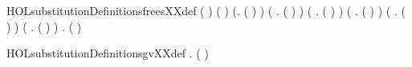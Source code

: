 \newcommand{\HOLsubstitutionDefinitionsfmlaXXsizeXXdef}{\UseVerbatim{HOLsubstitutionDefinitionsfmlaXXsizeXXdef}}
\begin{SaveVerbatim}{HOLsubstitutionDefinitionsfreesXXdef}
\HOLTokenTurnstile{} (  \HOLSymConst{=} \HOLTokenLeftbrace{}\HOLTokenRightbrace{}) \HOLSymConst{\HOLTokenConj{}} (  \HOLSymConst{=} \HOLTokenLeftbrace{}\HOLTokenRightbrace{}) \HOLSymConst{\HOLTokenConj{}}
   (\HOLSymConst{\HOLTokenForall{}}.  ( ) \HOLSymConst{=} \HOLTokenLeftbrace{}\HOLTokenRightbrace{}) \HOLSymConst{\HOLTokenConj{}}
   (\HOLSymConst{\HOLTokenForall{}} .  (  ) \HOLSymConst{=}   \HOLConst{\HOLTokenUnion{}}  ) \HOLSymConst{\HOLTokenConj{}}
   (\HOLSymConst{\HOLTokenForall{}} .  (  ) \HOLSymConst{=}   \HOLConst{\HOLTokenUnion{}}  ) \HOLSymConst{\HOLTokenConj{}}
   (\HOLSymConst{\HOLTokenForall{}} .  (  ) \HOLSymConst{=}  ) \HOLSymConst{\HOLTokenConj{}}
   (\HOLSymConst{\HOLTokenForall{}} .  (  ) \HOLSymConst{=}  ) \HOLSymConst{\HOLTokenConj{}}
   (\HOLSymConst{\HOLTokenForall{}} .  (  ) \HOLSymConst{=}    ) \HOLSymConst{\HOLTokenConj{}}
   \HOLSymConst{\HOLTokenForall{}} .  (  ) \HOLSymConst{=}    
\end{SaveVerbatim}
\newcommand{\HOLsubstitutionDefinitionsfreesXXdef}{\UseVerbatim{HOLsubstitutionDefinitionsfreesXXdef}}
\begin{SaveVerbatim}{HOLsubstitutionDefinitionsgvXXdef}
\HOLTokenTurnstile{} \HOLSymConst{\HOLTokenForall{}}  .     \HOLSymConst{=}  (   ) 
\end{SaveVerbatim}
